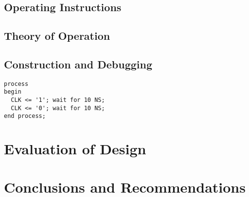 \documentclass{article}
\begin{document}
  \subsection{Operating Instructions}


  \subsection{Theory of Operation}
  

  \subsection{Construction and Debugging}


    \begin{verbatim}
process
begin
  CLK <= '1'; wait for 10 NS;
  CLK <= '0'; wait for 10 NS;
end process;
    \end{verbatim}

\section{Evaluation of Design}
  

\section{Conclusions and Recommendations}
\end{document}
